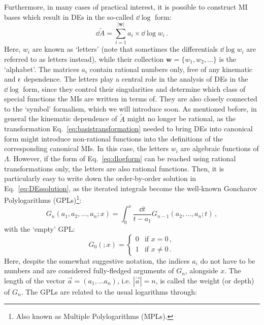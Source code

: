 \documentclass[main.tex]{subfiles}
\begin{document}
Furthermore, in many cases of practical interest, it is possible to construct MI bases which result in DEs in the so-called $\dd \log$ form:
\begin{equation} \label{eq:dlogform}
    \dd\tilde{A} = \sum_{i=1}^{|\bm{w}|} a_i \times \dd \log w_i\,.
\end{equation}
Here, $w_i$ are known as `letters' (note that sometimes the differentials $\dd \log w_i$ are referred to as letters instead), while their collection $\bm{w} = \{w_1, w_2, \ldots\}$ is the `alphabet'. The matrices $a_i$ contain rational numbers only, free of any kinematic and $\epsilon$ dependence. The letters play a central role in the analysis of DEs in the $\dd \log$ form, since they control their singularities and determine which class of special functions the MIs are written in terms of. They are also closely connected to the `symbol' formalism, which we will introduce soon. As mentioned before, in general the kinematic dependence of $\tilde{A}$ might no longer be rational, as the transformation Eq.~\ref{eq:basistransformation} needed to bring DEs into canonical form might introduce non-rational functions into the definitions of the corresponding canonical MIs. In this case, the letters $w_i$ are algebraic functions of $\Lambda$. However, if the form of Eq.~\ref{eq:dlogform} can be reached using rational transformations only, the letters are also rational functions. Then, it is particularly easy to write down the order-by-order solution in Eq.~\ref{eq:DEssolution}, as the iterated integrals become the well-known Goncharov Polylogarithms (GPLs)\footnote{Also known as Multiple Polylogarithms (MPLs).}\cite{2001math......3059G, 2011arXiv1105.2076G, Vollinga:2004sn}:
\begin{equation} \label{eq:GPLs}
    G_n(a_1, a_2, \ldots, a_n; x) = \int_0^x \frac{\dd t}{t-a_1} G_{n-1}(a_2, \ldots, a_n; t)\,,
\end{equation}
with the `empty' GPL:
\begin{equation}
    G_0(; x) = 
    \begin{cases}
        0 & \text{if } x = 0\,, \\
        1 & \text{if } x \neq 0\,. 
    \end{cases}
\end{equation}
Here, despite the somewhat suggestive notation, the indices $a_i$ do not have to be numbers and are considered fully-fledged arguments of $G_n$, alongside $x$. The length of the vector $\vec{a} = (a_1, \ldots a_n)$, i.e. $|\vec{a}|=n$, is called the weight (or depth) of $G_n$. The GPLs are related to the usual logarithms through:
\end{document}
